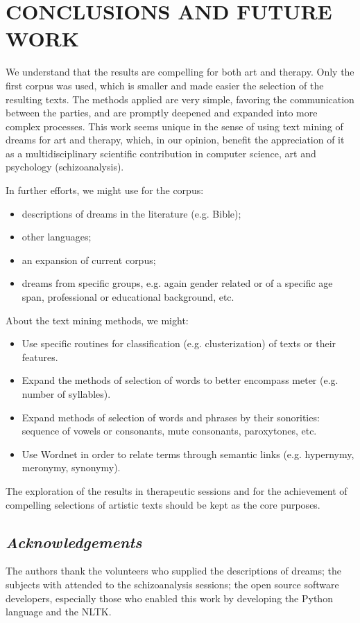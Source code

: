 \documentclass[12pt,fleqn]{article}
\begin{document}
\newpage %

\section{CONCLUSIONS AND FUTURE WORK}
We understand that the results are compelling for both art and therapy.
Only the first corpus was used, which is smaller and made easier the selection of the resulting texts.
The methods applied are very simple, favoring the communication between the parties,
and are promptly deepened and expanded into more complex processes.
This work seems unique in the sense of using text mining of dreams for art and therapy,
which, in our opinion, benefit the appreciation of it as a multidisciplinary scientific contribution
in computer science, art and psychology (schizoanalysis).

In further efforts,
we might use for the corpus:
\begin{itemize}
	\item descriptions of dreams in the literature (e.g. Bible);
	\item other languages;
	\item an expansion of current corpus;
	\item dreams from specific groups, e.g. again gender related or of a specific age span, professional or educational background, etc.
\end{itemize}

\noindent About the text mining methods, we might:
\begin{itemize}
	\item Use specific routines for classification (e.g. clusterization) of texts or their features.
	\item Expand the methods of selection of words to better encompass meter (e.g. number of syllables).
	\item Expand methods of selection of words and phrases by their sonorities: sequence of vowels or consonants, mute consonants, paroxytones, etc.
	\item Use Wordnet in order to relate terms through semantic links (e.g. hypernymy, meronymy, synonymy).
\end{itemize}

The exploration of the results in therapeutic sessions and for the achievement of compelling selections of
artistic texts should be kept as the core purposes.

\subsection*{\textit{Acknowledgements}}
The authors thank the volunteers who supplied the descriptions of dreams;
the subjects with attended to the schizoanalysis sessions;
the open source software developers, especially those who enabled this work by developing
the Python language and the NLTK.
\end{document}
